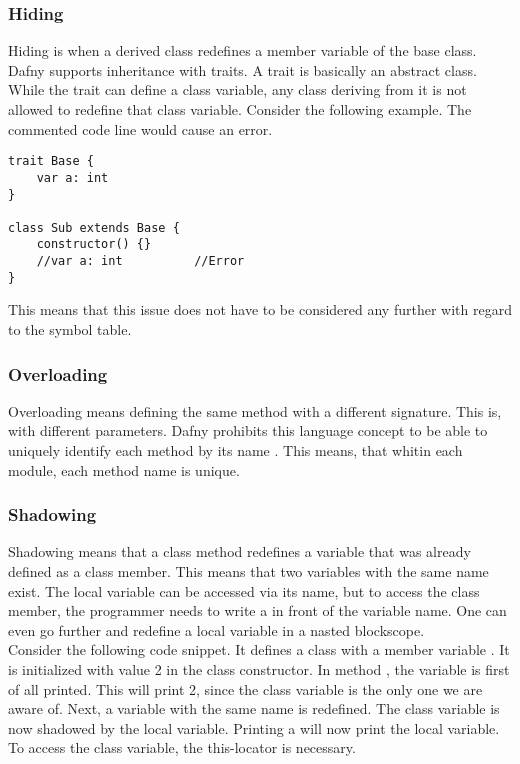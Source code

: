 \subsubsection{Hiding}
Hiding is when a derived class redefines a member variable of the base class. Dafny supports inheritance with traits. A trait is basically an abstract class. While the trait can define a class variable, any class deriving from it is not allowed to redefine that class variable. Consider the following example. The commented code line would cause an error. \cite{dafnyReferenceManual}

\begin{lstlisting}[caption={Hiding}, captionpos=b, label={lst:hiding}]
trait Base {
    var a: int
}

class Sub extends Base {
    constructor() {}
    //var a: int          //Error
}
\end{lstlisting}

This means that this issue does not have to be considered any further with regard to the symbol table.

\subsubsection{Overloading}
Overloading means defining the same method with a different signature. This is, with different parameters. Dafny prohibits this language concept to be able to uniquely identify each method by its name \cite{dafnyReferenceManual}.
This means, that whitin each module, each method name is unique.

\subsubsection{Shadowing}

Shadowing means that a class method redefines a variable that was already defined as a class member. This means that two variables with the same name exist. The local variable can be accessed via its name, but to access the class member, the programmer needs to write a  in front of the variable name. One can even go further and redefine a local variable in a nasted blockscope.\\

Consider the following code snippet. It defines a class with a member variable . It is initialized with value 2 in the class constructor. In method , the variable  is first of all printed. This will print 2, since the class variable is the only one we are aware of. Next, a variable with the same name is redefined. The class variable is now shadowed by the local variable. Printing a will now print the local variable. To access the class variable, the this-locator is necessary.

